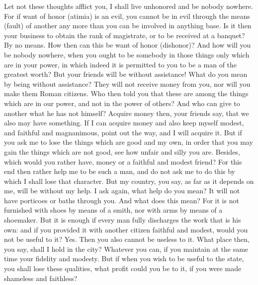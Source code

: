 Let  not these  thoughts afflict  you,  I shall  live unhonored  and be  nobody
nowhere.  For if  want of  honor (atimia)  is an  evil, you  cannot be  in evil
through the  means (fault)  of another  any more  than you  can be  involved in
anything base. Is it then your business to obtain the rank of magistrate, or to
be received  at a  banquet? By no  means. How  then can this  be want  of honor
(dishonor)? And how will  you be nobody nowhere, when you  ought to be somebody
in those things only  which are in your power, in which  indeed it is permitted
to you  to be a  man of the  greatest worth? But  your friends will  be without
assistance! What do you mean by being without assistance? They will not receive
money from you, nor  will you make them Roman citizens. Who  then told you that
these are  among the things  which are in  our power, and  not in the  power of
others? And  who can  give to another  what he has  not himself?  Acquire money
then, your friends say, that we also may have something. If I can acquire money
and also keep  myself modest, and faithful and magnanimous,  point out the way,
and I will acquire it. But if you ask  me to lose the things which are good and
my own,  in order  that you may  gain the  things which are  not good,  see how
unfair and  silly you  are. Besides, which  would you rather  have, money  or a
faithful and modest friend? For this end then  rather help me to be such a man,
and do  not ask  me to do  this by which  I shall  lose that character.  But my
country, you say,  as far as it depends  on me, will be without my  help. I ask
again, what help do you mean? It  will not have porticoes or baths through you.
And what  does this  mean? For it  is not  furnished with shoes  by means  of a
smith, nor  with arms by means  of a shoemaker. But  it is enough if  every man
fully discharges the work that is his  own: and if you provided it with another
citizen faithful and modest, would you not  be useful to it? Yes. Then you also
cannot be useless  to it. What place then,  you say, shall I hold  in the city?
Whatever you can, if  you maintain at the same time  your fidelity and modesty.
But if when you wish to be useful to the state, you shall lose these qualities,
what profit could you be to it, if you were made shameless and faithless?

